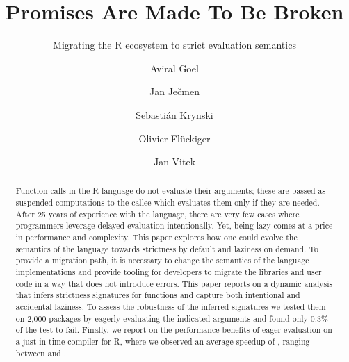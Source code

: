 \documentclass[review,nonacm,screen,acmsmall,anonymous=true]{acmart}
\begin{document}
\title{Promises Are Made To Be Broken}
\subtitle{Migrating the R ecosystem to strict evaluation semantics}

\author{Aviral Goel}
\author{Jan Ječmen}
\author{Sebastián Krynski}
\author{Olivier Flückiger}
\author{Jan Vitek}
\authorsaddresses{}
\renewcommand{\shortauthors}{Goel, Vitek}

\begin{abstract}
  Function calls in the R language do not evaluate their arguments; these are
  passed as suspended computations to the callee which evaluates them only if
  they are needed. After 25 years of experience with the language, there are
  very few cases where programmers leverage delayed evaluation intentionally.
  Yet, being lazy comes at a price in performance and complexity. This paper
  explores how one could evolve the semantics of the language towards strictness
  by default and laziness on demand. To provide a migration path, it is
  necessary to change the semantics of the language implementations and provide
  tooling for developers to migrate the libraries and user code in a way that
  does not introduce errors. This paper reports on a dynamic analysis that
  infers strictness signatures for functions and capture both intentional and
  accidental laziness.
  To assess the robustness of the inferred signatures we tested them on 2,000
  packages by eagerly evaluating the indicated arguments and found only 0.3\% of
  the test to fail.  Finally, we report on the
  performance benefits of eager evaluation on a just-in-time compiler for R,
  where we observed an average speedup of \speedupRshStrict, ranging between \speedupRshStrictMin and \speedupRshStrictMax.
\end{abstract}
\end{document}
